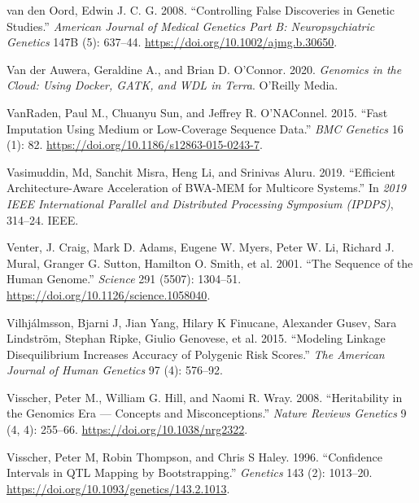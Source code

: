 \documentclass[
]{book}
\newlength{\cslhangindent}
\newlength{\cslentryspacingunit} %
\newenvironment{CSLReferences}[2] %
 {%
  \setlength{\parindent}{0pt}
  \ifodd #1
  \let\oldpar\par
  \def\par{\hangindent=\cslhangindent\oldpar}
  \fi
  \setlength{\parskip}{#2\cslentryspacingunit}
 }%
 {}
\begin{document}
\begin{CSLReferences}{1}{0}
\leavevmode{}%
van den Oord, Edwin J. C. G. 2008. {``Controlling False Discoveries in Genetic Studies.''} \emph{American Journal of Medical Genetics Part B: Neuropsychiatric Genetics} 147B (5): 637--44. \url{https://doi.org/10.1002/ajmg.b.30650}.

\leavevmode{}%
Van der Auwera, Geraldine A., and Brian D. O'Connor. 2020. \emph{Genomics in the Cloud: Using {Docker}, {GATK}, and {WDL} in {Terra}}. {O'Reilly Media}.

\leavevmode{}%
VanRaden, Paul M., Chuanyu Sun, and Jeffrey R. O'NAConnel. 2015. {``Fast Imputation Using Medium or Low-Coverage Sequence Data.''} \emph{BMC Genetics} 16 (1): 82. \url{https://doi.org/10.1186/s12863-015-0243-7}.

\leavevmode{}%
Vasimuddin, Md, Sanchit Misra, Heng Li, and Srinivas Aluru. 2019. {``Efficient Architecture-Aware Acceleration of {BWA-MEM} for Multicore Systems.''} In \emph{2019 {IEEE International Parallel} and {Distributed Processing Symposium} ({IPDPS})}, 314--24. {IEEE}.

\leavevmode{}%
Venter, J. Craig, Mark D. Adams, Eugene W. Myers, Peter W. Li, Richard J. Mural, Granger G. Sutton, Hamilton O. Smith, et al. 2001. {``The {Sequence} of the {Human Genome}.''} \emph{Science} 291 (5507): 1304--51. \url{https://doi.org/10.1126/science.1058040}.

\leavevmode{}%
Vilhjálmsson, Bjarni J, Jian Yang, Hilary K Finucane, Alexander Gusev, Sara Lindström, Stephan Ripke, Giulio Genovese, et al. 2015. {``Modeling Linkage Disequilibrium Increases Accuracy of Polygenic Risk Scores.''} \emph{The American Journal of Human Genetics} 97 (4): 576--92.

\leavevmode{}%
Visscher, Peter M., William G. Hill, and Naomi R. Wray. 2008. {``Heritability in the Genomics Era --- Concepts and Misconceptions.''} \emph{Nature Reviews Genetics} 9 (4, 4): 255--66. \url{https://doi.org/10.1038/nrg2322}.

\leavevmode{}%
Visscher, Peter M, Robin Thompson, and Chris S Haley. 1996. {``Confidence {Intervals} in {QTL Mapping} by {Bootstrapping}.''} \emph{Genetics} 143 (2): 1013--20. \url{https://doi.org/10.1093/genetics/143.2.1013}.


\end{CSLReferences}
\end{document}
